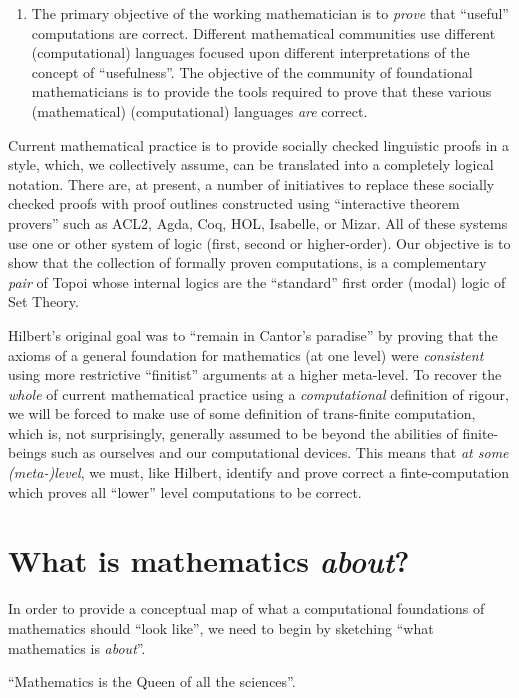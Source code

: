 \begin{enumerate}
\item	The primary objective of the working mathematician is to \emph{prove} that
``useful'' computations are correct. Different mathematical communities use
different (computational) languages focused upon different interpretations of
the concept of ``usefulness''. The objective of the community of foundational
mathematicians is to provide the tools required to prove that these various
(mathematical) (computational) languages \emph{are} correct.

\end{enumerate}

Current mathematical practice is to provide socially checked linguistic proofs
in a style, which, we collectively assume, can be translated into a completely
logical notation. There are, at present, a number of initiatives to replace
these socially checked proofs with proof outlines constructed using
``interactive theorem provers'' such as ACL2, Agda, Coq, HOL, Isabelle, or
Mizar. All of these systems use one or other system of logic (first, second or
higher-order). Our objective is to show that the collection of formally proven
computations, is a complementary \emph{pair} of Topoi whose internal logics are
the ``standard'' first order (modal) logic of Set Theory.

Hilbert's original goal was to ``remain in Cantor's paradise'' by proving that
the axioms of a general foundation for mathematics (at one level) were
\emph{consistent} using more restrictive ``finitist'' arguments at a higher
meta-level. To recover the \emph{whole} of current mathematical practice using a
\emph{computational} definition of rigour, we will be forced to make use of some
definition of trans-finite computation, which is, not surprisingly, generally
assumed to be beyond the abilities of finite-beings such as ourselves and our
computational devices. This means that \emph{at some (meta-)level}, we must,
like Hilbert, identify and prove correct a finte-computation which proves all
``lower'' level computations to be correct.

\section{What is mathematics \emph{about}?}

In order to provide a conceptual map of what a computational foundations of
mathematics should ``look like'', we need to begin by sketching ``what
mathematics is \emph{about}''.

``Mathematics is the Queen of all the sciences''. 

